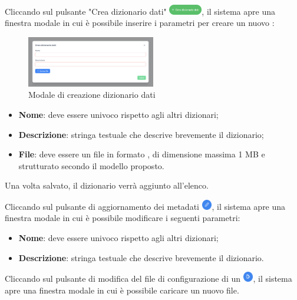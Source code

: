 \par Cliccando sul pulsante "Crea dizionario dati" \includegraphics[height=1.2em]{assets/dd_create_button.png}, il sistema apre una finestra modale in cui è possibile inserire i parametri per creare un nuovo :
\begin{figure}[H]
  \centering
  \includegraphics[width=0.5\textwidth]{assets/dd_modal_create.png}
  \caption{Modale di creazione dizionario dati}
\end{figure}
\begin{itemize}
  \item \textbf{Nome}: deve essere univoco rispetto agli altri dizionari;
  \item \textbf{Descrizione}: stringa testuale che descrive brevemente il dizionario;
  \item \textbf{File}: deve essere un file in formato , di dimensione massima 1 MB e strutturato secondo il modello proposto.
\end{itemize}
\vspace{0.5\baselineskip}
\par Una volta salvato, il dizionario verrà aggiunto all'elenco.

\par Cliccando sul pulsante di aggiornamento dei metadati \includegraphics[height=1.2em]{assets/dd_edit_metadata_button.png}, il sistema apre una finestra modale in cui è possibile modificare i seguenti parametri:
\begin{itemize}
  \item \textbf{Nome}: deve essere univoco rispetto agli altri dizionari;
  \item \textbf{Descrizione}: stringa testuale che descrive brevemente il dizionario.
\end{itemize}

\par Cliccando sul pulsante di modifica del file di configurazione di un  \includegraphics[height=1.2em]{assets/dd_edit_button.png}, il sistema apre una finestra modale in cui è possibile caricare un nuovo file.

